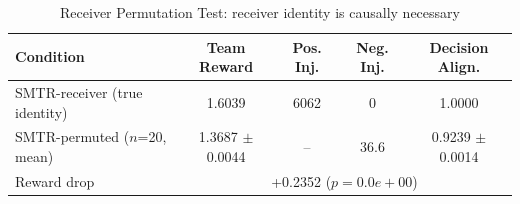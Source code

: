\begin{table}[t]
\caption{Receiver Permutation Test: receiver identity is causally necessary}
\label{tab:receiver_permutation}
\centering
\begin{tabular}{l c c c c}
\toprule
Condition & Team Reward & Pos. Inj. & Neg. Inj. & Decision Align. \\
\midrule
SMTR-receiver (true identity) & 1.6039 & 6062 & 0 & 1.0000 \\
SMTR-permuted ($n$=20, mean) & 1.3687 $\pm$ 0.0044 & -- & 36.6 & 0.9239 $\pm$ 0.0014 \\
\midrule
Reward drop & \multicolumn{4}{c}{+0.2352 ($p = 0.0e+00$)} \\
\bottomrule
\end{tabular}
\end{table}